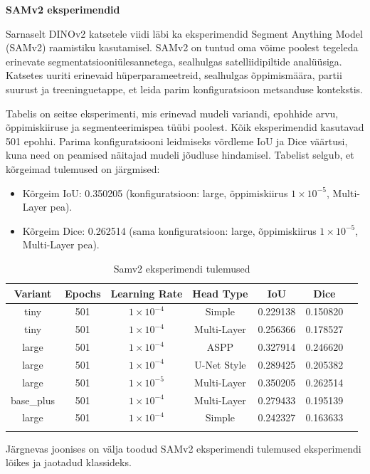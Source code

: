 \textbf{SAMv2 eksperimendid}

Sarnaselt DINOv2 katsetele viidi läbi ka eksperimendid Segment Anything Model (SAMv2) raamistiku kasutamisel. SAMv2 on tuntud oma võime poolest tegeleda erinevate segmentatsiooniülesannetega, sealhulgas satelliidipiltide analüüsiga. Katsetes uuriti erinevaid hüperparameetreid, sealhulgas õppimismäära, partii suurust ja treeninguetappe, et leida parim konfiguratsioon metsanduse kontekstis.

Tabelis on seitse eksperimenti, mis erinevad mudeli variandi, epohhide arvu,
õppimiskiiruse ja segmenteerimispea tüübi poolest. Kõik eksperimendid kasutavad
501 epohhi. Parima konfiguratsiooni leidmiseks võrdleme IoU ja Dice väärtusi, kuna need on peamised näitajad mudeli jõudluse hindamisel. Tabelist selgub, et kõrgeimad tulemused on järgmised:

\begin{itemize}
    \item Kõrgeim IoU:  0.350205 (konfiguratsioon: large, õppimiskiirus $1 \times 10^{-5}$, Multi-Layer pea).
    \item Kõrgeim Dice:  0.262514 (sama konfiguratsioon: large, õppimiskiirus $1 \times 10^{-5}$, Multi-Layer pea).
\end{itemize}

\begin{longtable}{ccccccc}
    \hline
    Variant & Epochs & Learning Rate & Head Type & IoU & Dice \\
    \hline
        tiny &  501 & $1 \times 10^{-4}$ & Simple & 0.229138 & 0.150820\\
        tiny &  501 & $1 \times 10^{-4}$ & Multi-Layer & 0.256366 & 0.178527 \\
        large &  501 & $1 \times 10^{-4}$ & ASPP & 0.327914 & 0.246620  \\
        large &  501 & $1 \times 10^{-4}$ & U-Net Style & 0.289425 & 0.205382  \\
        large &  501 & $1 \times 10^{-5}$ & Multi-Layer & 0.350205 & 0.262514 \\
        base\_plus & 501 & $1 \times 10^{-4}$ & Multi-Layer & 0.279433 & 0.195139  \\
        large &  501 & $1 \times 10^{-4}$ & Simple & 0.242327 & 0.163633 \\
    \hline
\caption{Samv2 eksperimendi tulemused}
\label{tab:samv2_results}
\end{longtable}

Järgnevas joonises on välja toodud SAMv2 eksperimendi tulemused eksperimendi lõikes ja jaotadud klassideks.

